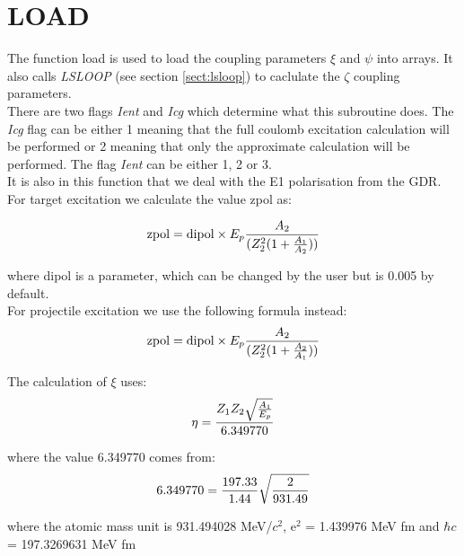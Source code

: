 \section{LOAD}
\label{sect:load}

The function load is used to load the coupling parameters $\xi$ and $\psi$
into arrays. It also calls {\em LSLOOP} (see section \ref{sect:lsloop}) to
caclulate the $\zeta$ coupling parameters.\\

\noindent There are two flags {\em Ient} and {\em Icg} which determine
what this subroutine does. The {\em Icg} flag can be either 1 meaning
that the full coulomb excitation calculation will be performed or 2
meaning that only the approximate calculation will be performed. The
flag {\em Ient} can be either 1, 2 or 3.\\

\noindent It is also in this function that we deal with the E1 polarisation from the
GDR. For target excitation we calculate the value zpol as:

\begin{equation}
\mathrm{zpol} = \mathrm{dipol} \times E_p {A_2 \over(Z_2^2 (1 + {A_1 \over
A_2}))}
\end{equation}

\noindent where dipol is a parameter, which can be changed by the user but is 0.005 by
default.\\

\noindent For projectile excitation we use the following formula instead:\\

\begin{equation}
\mathrm{zpol} = \mathrm{dipol} \times E_p {A_2 \over(Z_2^2 (1 + {A_2 \over
A_1}))}
\end{equation}

\noindent The calculation of $\xi$ uses:\\

\begin{equation}
\eta = {Z_1 Z_2 \sqrt{A_1 \over E_p} \over 6.349770}
\end{equation}

\noindent where the value 6.349770 comes from:\\

\begin{equation}
6.349770 = {197.33 \over 1.44} \sqrt{2 \over 931.49}
\end{equation}

\noindent where the atomic mass unit is 931.494028 MeV/$c^2$, e$^2$ =
1.439976 MeV fm and $\hbar c$ = 197.3269631 MeV fm\\

